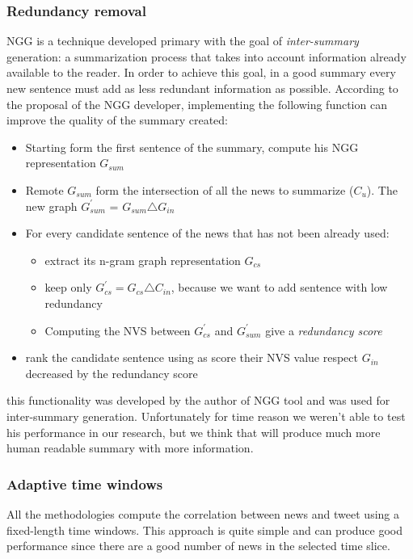 \subsubsection*{Redundancy removal}
NGG is a technique developed primary with the goal of \emph{inter-summary} generation: a summarization process that takes into account information already available to the reader. In order to achieve this goal, in a good summary every new sentence must add as less redundant information as possible.
According to the proposal of the NGG developer, implementing the following function can improve the quality of the summary created:
\begin{itemize}
	\item Starting form the first sentence of the summary, compute his NGG representation $G_{sum}$
	\item Remote $G_{sum}$ form the intersection of all the news to summarize ($C_{u}$). The new graph $G_{sum}^{\prime}$ = $G_{sum} \triangle G_{in}$
	\item For every candidate sentence of the news that has not been already used:
	\begin{itemize}
		\item extract its n-gram graph representation $G_{cs}$
		\item keep only $G_{cs}^{\prime} = G_{cs} \triangle C_{in}$, because we want to add sentence with low redundancy
		\item Computing the NVS between $G_{cs}^{\prime}$ and $G_{sum}^{\prime}$ give a \emph{redundancy score}
	\end{itemize}
	\item rank the candidate sentence using as score their NVS value respect $G_{in}$ decreased by the redundancy score
\end{itemize}
this functionality was developed by the author of NGG tool and was used for inter-summary generation. Unfortunately for time reason we weren't able to test his performance in our research, but we think that will produce much more human readable summary with more information.

\subsubsection*{Adaptive time windows}
All the methodologies compute the correlation between news and tweet using a fixed-length time windows. This approach is quite simple and can produce good performance since there are a good number of news in the selected time slice. 

